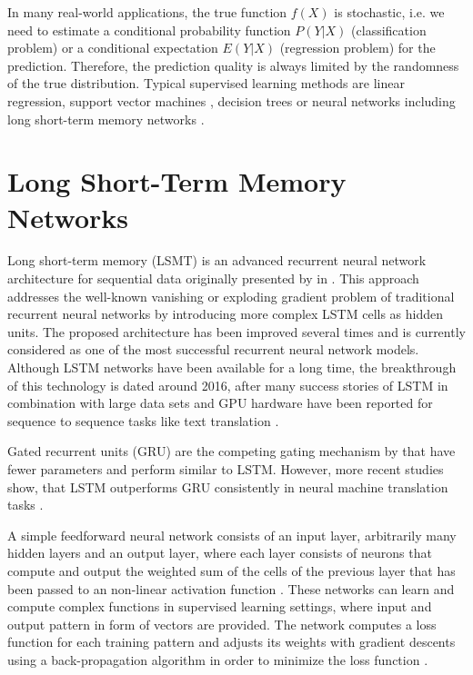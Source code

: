 In many real-world applications, the true function $f(X)$ is stochastic, i.e. we need to estimate a conditional probability function $P(Y | X)$ (classification problem) or a conditional expectation $E(Y | X)$ (regression problem) for the prediction.
Therefore, the prediction quality is always limited by the randomness of the true distribution.
Typical supervised learning methods are linear regression, support vector machines \cite{DBLP:journals/ml/CortesV95}, decision trees \cite{DBLP:journals/ml/Quinlan86} or neural networks including long short-term memory networks \cite{DBLP:journals/neco/HochreiterS97}.

\section{Long Short-Term Memory Networks}

Long short-term memory (LSMT) is an advanced recurrent neural network architecture for sequential data originally presented by \citeauthor{DBLP:journals/neco/HochreiterS97} in \citeyear{DBLP:journals/neco/HochreiterS97} \cite{DBLP:journals/neco/HochreiterS97}.
This approach addresses the well-known vanishing or exploding gradient problem \cite{DBLP:conf/icml/PascanuMB13}  of traditional recurrent neural networks by introducing more complex LSTM cells as hidden units.
The proposed architecture has been improved several times \cite{DBLP:journals/neco/GersSC00} \cite {DBLP:journals/tnn/GreffSKSS17} and is currently considered as one of the most successful recurrent neural network models.
Although LSTM networks have been available for a long time, the breakthrough of this technology is dated around 2016, after many success stories of LSTM in combination with large data sets and GPU hardware have been reported for sequence to sequence tasks like text translation \cite{DBLP:journals/corr/WuSCLNMKCGMKSJL16}.

Gated recurrent units (GRU) \cite{DBLP:conf/emnlp/ChoMGBBSB14} are the competing gating mechanism by \citeauthor{DBLP:conf/emnlp/ChoMGBBSB14} that have fewer parameters and perform similar to LSTM.
However, more recent studies show, that LSTM outperforms GRU consistently in neural machine translation tasks \cite{DBLP:journals/corr/BritzGLL17}.

A simple feedforward neural network consists of an input layer, arbitrarily many hidden layers and an output layer, where each layer consists of neurons that compute and output the weighted sum of the cells of the previous layer that has been passed to an non-linear activation function \cite{DBLP:journals/nn/Schmidhuber15}.
These networks can learn and compute complex functions in supervised learning settings, where input and output pattern in form of vectors are provided.
The network computes a loss function for each training pattern and adjusts its weights with gradient descents using a back-propagation algorithm in order to minimize the loss function \cite{rumelhart1986learning}.

